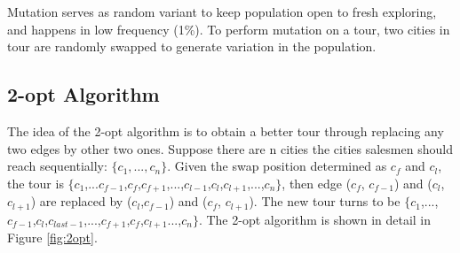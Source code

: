 \documentclass[twocolumn]{article}
\begin{document}
Mutation serves as random variant to keep population open to fresh exploring, and happens in low frequency (1\%). To perform mutation on a tour, two cities in tour are randomly swapped to generate variation in the population. 
\subsection{2-opt Algorithm}

The idea of the 2-opt algorithm\cite{helsgaun2000effective} is to obtain a better tour through replacing any two edges by other two ones. Suppose there are n cities the cities salesmen should reach sequentially: $\{c_{1},...,c_{n}\}$. Given the swap position determined as $c_{f}$ and $c_{l}$, the tour is $\{c_{1}$,...$c_{f-1}$,$c_{f}$,$c_{f+1}$,...,$c_{l-1}$,$c_{l}$,$c_{l+1}$,...,$c_{n}\}$, then edge ($c_{f}$, $c_{f-1}$) and ($c_{l}$, $c_{l+1}$) are replaced by ($c_{l}$,$c_{f-1}$) and ($c_{f}$, $c_{l+1}$). The new tour turns to be  $\{c_{1}$,...,$c_{f-1}$,$c_{l}$,$c_{last-1}$,...,$c_{f+1}$,$c_{f}$,$c_{l+1}$...,$c_{n}\}$. The 2-opt algorithm is shown in detail in Figure \ref{fig:2opt}.
\end{document}
